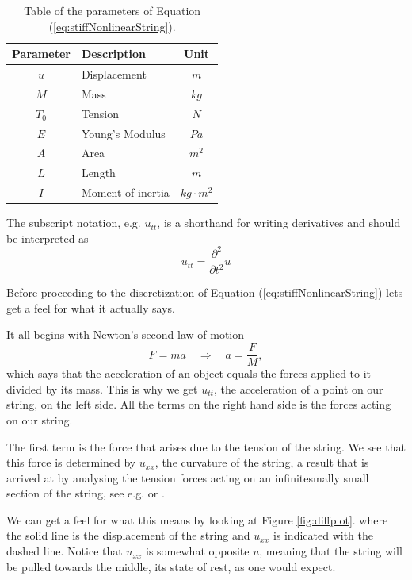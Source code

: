 \documentclass{article}
\begin{document}
\begin{table}[h]
\centering
\begin{tabularx}{\linewidth}{c | l | c}
  Parameter & Description & Unit \\
  \hline
  $u$ & Displacement & $m$ \\
  $M$ & Mass & $kg$ \\
  $T_0$ & Tension & $N$ \\
  $E$ & Young's Modulus & $Pa$ \\
  $A$ & Area & $m^2$ \\
  $L$ & Length & $m$ \\
  $I$ & Moment of inertia & $kg \cdot m^2$
\end{tabularx}
\label{table:stringParamters}
\caption{Table of the parameters of Equation (\ref{eq:stiffNonlinearString}).}
\end{table}

The subscript notation, e.g. $u_{tt}$, is a shorthand for writing derivatives and should be interpreted as
\begin{equation}
  u_{tt} = \frac{\partial^2}{\partial t^2}u
\end{equation}

Before proceeding to the discretization of Equation (\ref{eq:stiffNonlinearString}) lets get a feel for what it actually says.

It all begins with Newton's second law of motion
\begin{equation}
  F = m a \quad \Rightarrow \quad a = \frac{F}{M},
\end{equation}
which says that the acceleration of an object equals the forces applied to it divided by its mass.
This is why we get $u_{tt}$, the acceleration of a point on our string, on the left side.
All the terms on the right hand side is the forces acting on our string.

The first term is the force that arises due to the tension of the string.
We see that this force is determined by $u_{xx}$, the curvature of the string, a result that is arrived at by analysing the tension forces acting on an infinitesmally small section of the string, see e.g. \cite[Chapter~2]{fletcher_physics_1998} or \cite[Chapter~6]{bilbao_numerical_2009}.

We can get a feel for what this means by looking at Figure \ref{fig:diffplot}. where the solid line is the displacement of the string and $u_{xx}$ is indicated with the dashed line.
Notice that $u_{xx}$ is somewhat opposite $u$, meaning that the string will be pulled towards the middle, its state of rest, as one would expect.
\end{document}
